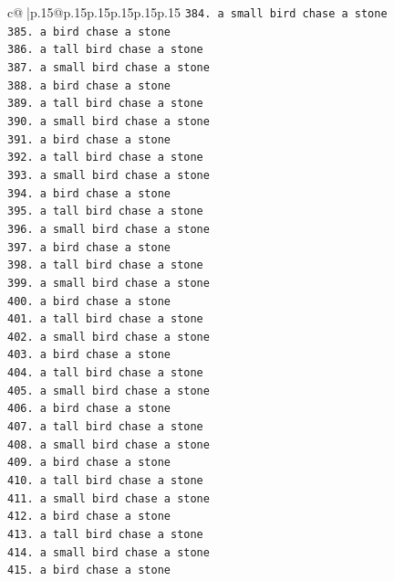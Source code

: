 \documentclass{article}
\begin{document}
{\begin{supertabular}{c@{$\;$}|p{.15\linewidth}@{}p{.15\linewidth}p{.15\linewidth}p{.15\linewidth}p{.15\linewidth}p{.15\linewidth}}
{{{\texttt{384. a small bird chase a stone} \\
\texttt{385. a bird chase a stone} \\
\texttt{386. a tall bird chase a stone} \\
\texttt{387. a small bird chase a stone} \\
\texttt{388. a bird chase a stone} \\
\texttt{389. a tall bird chase a stone} \\
\texttt{390. a small bird chase a stone} \\
\texttt{391. a bird chase a stone} \\
\texttt{392. a tall bird chase a stone} \\
\texttt{393. a small bird chase a stone} \\
\texttt{394. a bird chase a stone} \\
\texttt{395. a tall bird chase a stone} \\
\texttt{396. a small bird chase a stone} \\
\texttt{397. a bird chase a stone} \\
\texttt{398. a tall bird chase a stone} \\
\texttt{399. a small bird chase a stone} \\
\texttt{400. a bird chase a stone} \\
\texttt{401. a tall bird chase a stone} \\
\texttt{402. a small bird chase a stone} \\
\texttt{403. a bird chase a stone} \\
\texttt{404. a tall bird chase a stone} \\
\texttt{405. a small bird chase a stone} \\
\texttt{406. a bird chase a stone} \\
\texttt{407. a tall bird chase a stone} \\
\texttt{408. a small bird chase a stone} \\
\texttt{409. a bird chase a stone} \\
\texttt{410. a tall bird chase a stone} \\
\texttt{411. a small bird chase a stone} \\
\texttt{412. a bird chase a stone} \\
\texttt{413. a tall bird chase a stone} \\
\texttt{414. a small bird chase a stone} \\
\texttt{415. a bird chase a stone} \\
}}}
\end{supertabular}}
\end{document}
